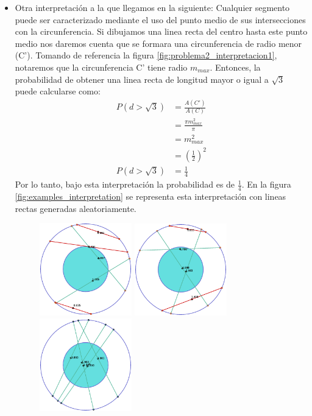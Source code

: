 \begin{itemize}
    \item Otra interpretación a la que llegamos en la siguiente: Cualquier segmento puede ser caracterizado mediante el uso del punto medio de sus intersecciones con la circunferencia. Si dibujamos una linea recta del centro hasta este punto medio nos daremos cuenta que se formara una circunferencia de radio menor (C'). Tomando de referencia la figura \ref{fig:problema2_interpretacion1}, notaremos que la circunferencia C' tiene radio $m_{max}$. Entonces, la probabilidad de obtener una linea recta de longitud mayor o igual a $\sqrt{3}$ puede calcularse como:
          \begin{align*}
              P(d>\sqrt{3}) & = \frac{A(C')}{A(C)}         \\
                            & = \frac{\pi m_{max}^2}{\pi}  \\
                            & = m_{max}^2                  \\
                            & = \left(\frac{1}{2}\right)^2 \\
              P(d>\sqrt{3}) & = \frac{1}{4}
          \end{align*}
          Por lo tanto, bajo esta interpretación la probabilidad es de  $\frac{1}{4}$. En la figura \ref{fig:examples_interpretation} se representa esta interpretación con lineas rectas generadas aleatoriamente.
          \begin{figure}[H]
              \centering
              \includegraphics[width=4cm]{Graphics/circle_3_1.eps}
              \includegraphics[width=4cm]{Graphics/circle_3_2.eps}
              \includegraphics[width=4cm]{Graphics/circle_3_3.eps}

\end{figure}
\end{itemize}
